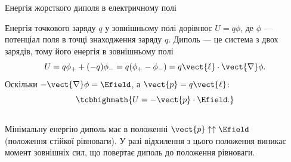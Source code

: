 \documentclass{beamer}
\begin{document}
\begin{frame}{Енергія жорсткого диполя в електричному полі}{}
	\begin{block}{}\justifying
		Енергія точкового заряду $q$ у зовнішньому полі дорівнює $U = q\phi$, де $\phi$ ---
		потенціал поля в точці знаходження заряду $q$. Диполь --- це система з двох зарядів, тому
		його енергія в зовнішньому полі
		\begin{equation*}
			U= q\phi_+ + (-q)\phi_- = q (\phi_+ - \phi_-) = q \vect{\ell}\cdot\vect{\nabla}\phi.
		\end{equation*}
		Оскільки $-\vect{\nabla}\phi = \Efield$, а $\vect{p} = q\vect{\ell}$:
		\begin{equation*}
			\tcbhighmath{
				U = -\vect{p}\cdot\Efield.
			}
		\end{equation*}
	\end{block}
	\begin{columns}
		\begin{column}{0.75\linewidth}
			\begin{block}{}\justifying\small
				Мінімальну енергію диполь має в положенні $\vect{p}
					\uparrow\uparrow \Efield$ (положення стійкої рівноваги). У разі відхилення з
					цього
				положення
				виникає момент зовнішніх сил, що повертає диполь до положення рівноваги.
			\end{block}
		\end{column}
		\begin{column}{0.25\linewidth}\centering
            
   		\end{column}
	\end{columns}
\end{frame}
\end{document}

